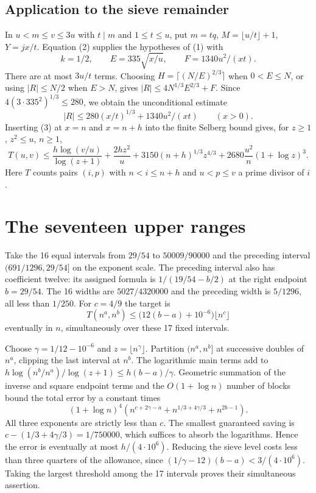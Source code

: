\documentclass[10pt]{article}
\begin{document}
\subsection*{Application to the sieve remainder}
In $u<m\le v\le3u$ with $t\mid m$ and $1\le t\le u$, put $m=tq$, $M=\lfloor u/t\rfloor+1$, $Y=jx/t$. Equation (2) supplies the hypotheses of (1) with
\[
 k=1/2,\qquad E=335\sqrt{x/u},\qquad F=1340u^2/(xt).
\]
There are at most $3u/t$ terms. Choosing $H=\lceil(N/E)^{2/3}\rceil$ when $0<E\le N$, or using $|R|\le N/2$ when $E>N$, gives $|R|\le 4N^{1/3}E^{2/3}+F$. Since $4(3\cdot335^2)^{1/3}\le280$, we obtain the unconditional estimate
\begin{equation}
 |R|\le280(x/t)^{1/3}+1340u^2/(xt)\qquad(x>0).
 \tag{3}
\end{equation}
Inserting (3) at $x=n$ and $x=n+h$ into the finite Selberg bound gives, for $z\ge1$, $z^2\le u$, $n\ge1$,
\[
 T(u,v)\le\frac{h\log(v/u)}{\log(z+1)}+\frac{2hz^2}{u}
    +3150(n+h)^{1/3}z^{4/3}
    +2680\frac{u^2}{n}(1+\log z)^3 .
\]
Here $T$ counts pairs $(i,p)$ with $n<i\le n+h$ and $u<p\le v$ a prime divisor of $i$.

\newpage
\section*{The seventeen upper ranges}
Take the 16 equal intervals from $29/54$ to $50009/90000$ and the preceding interval $(691/1296,29/54]$ on the exponent scale. The preceding interval also has coefficient twelve: its assigned formula is $1/(19/54-b/2)$ at the right endpoint $b=29/54$. The 16 widths are $5027/4320000$ and the preceding width is $5/1296$, all less than $1/250$. For $c=4/9$ the target is
\[
 T(n^a,n^b)\le \bigl(12(b-a)+10^{-6}\bigr)\lfloor n^c\rfloor
\]
eventually in $n$, simultaneously over these 17 fixed intervals.

Choose $\gamma=1/12-10^{-6}$ and $z=\lfloor n^\gamma\rfloor$. Partition $(n^a,n^b]$ at successive doubles of $n^a$, clipping the last interval at $n^b$. The logarithmic main terms add to $h\log(n^b/n^a)/\log(z+1)\le h(b-a)/\gamma$. Geometric summation of the inverse and square endpoint terms and the $O(1+\log n)$ number of blocks bound the total error by a constant times
\[
 (1+\log n)^4\left(
    n^{c+2\gamma-a}+n^{1/3+4\gamma/3}+n^{2b-1}\right).
\]
All three exponents are strictly less than $c$. The smallest guaranteed saving is $c-(1/3+4\gamma/3)=1/750000$, which suffices to absorb the logarithms. Hence the error is eventually at most $h/(4\cdot10^6)$. Reducing the sieve level costs less than three quarters of the allowance, since $(1/\gamma-12)(b-a)<3/(4\cdot10^6)$. Taking the largest threshold among the 17 intervals proves their simultaneous assertion.
\end{document}
